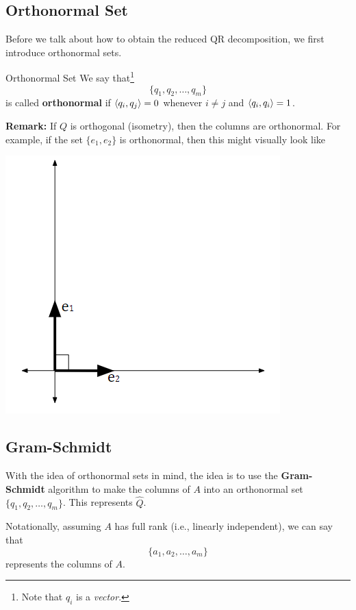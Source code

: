\documentclass[letterpaper]{article}
\newcommand{\0}{\mathbf{0}}
\begin{document}
\subsection{Orthonormal Set}
Before we talk about how to obtain the reduced QR decomposition, we first introduce orthonormal sets. 
\begin{definition}{Orthonormal Set}{}
    We say that\footnote{Note that $q_i$ is a \emph{vector}.}
    \[\{q_1, q_2, \hdots, q_m\}\]
    is called \textbf{orthonormal} if $\langle q_i, q_j \rangle = 0$ whenever $i \neq j$ and $\langle q_i, q_i \rangle = 1$.
\end{definition}
\textbf{Remark:} If $Q$ is orthogonal (isometry), then the columns are orthonormal. For example, if the set $\{e_1, e_2\}$ is orthonormal, then this might visually look like 
\begin{center}
    \includegraphics[scale=0.7]{../assets/orthonormal.png}
\end{center}

\subsection{Gram-Schmidt}
With the idea of orthonormal sets in mind, the idea is to use the \textbf{Gram-Schmidt} algorithm to make the columns of $A$ into an orthonormal set $\{q_1, q_2, \hdots, q_m\}$. This represents $\hat{Q}$. 

\bigskip 

Notationally, assuming $A$ has full rank (i.e., linearly independent), we can say that \[\{a_1, a_2, \hdots, a_m\}\] represents the columns of $A$. 
\end{document}
